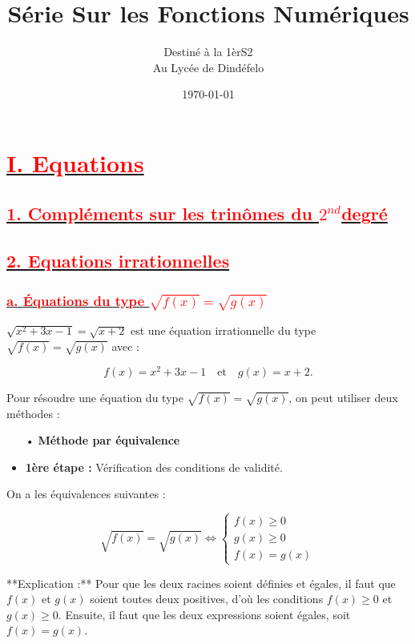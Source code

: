 \documentclass[12pt]{article}
\author{Destiné à la 1èrS2\\Au Lycée de Dindéfelo}
\title{\textbf{Série Sur les Fonctions Numériques}}
\date{\today}
\begin{document}
\maketitle
\newpage
\section*{\underline{\textbf{\textcolor{red}{I. Equations}}}}
\subsection*{\underline{\textbf{\textcolor{red}{1. Compléments sur les trinômes du \( 2^{nd} \)degré}}}}
\subsection*{\underline{\textbf{\textcolor{red}{2. Equations irrationnelles}}}}
\subsubsection*{\underline{\textbf{\textcolor{red}{a. Équations du type \( \sqrt{f(x)} = \sqrt{g(x)} \)}}}}

\( \sqrt{x^{2}+3x-1} = \sqrt{x+2} \) est une équation irrationnelle du type \( \sqrt{f(x)} = \sqrt{g(x)} \) avec :

\[ f(x) = x^{2}+3x-1 \quad \text{et} \quad g(x) = x+2. \]

Pour résoudre une équation du type \( \sqrt{f(x)} = \sqrt{g(x)} \), on peut utiliser deux méthodes :

\begin{itemize}
    \item[•] \textbf{Méthode par équivalence}
\end{itemize}

\begin{itemize}
    \item \textbf{1ère étape :} Vérification des conditions de validité.
\end{itemize}

On a les équivalences suivantes :

\[
\sqrt{ f(x)} = \sqrt{ g(x)} \Leftrightarrow \begin{cases}
f(x) \geq 0 \\
g(x) \geq 0 \\
f(x) = g(x)
\end{cases}
\]

**Explication :** Pour que les deux racines soient définies et égales, il faut que \( f(x) \) et \( g(x) \) soient toutes deux positives, d'où les conditions \( f(x) \geq 0 \) et \( g(x) \geq 0 \). Ensuite, il faut que les deux expressions soient égales, soit \( f(x) = g(x) \).
\end{document}
